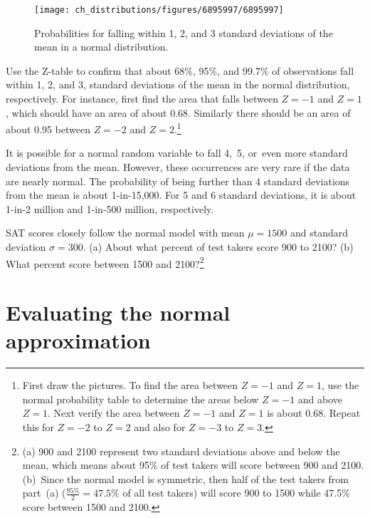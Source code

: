 \begin{figure}[hht]
\centering
\texttt{[image: ch\_distributions/figures/6895997/6895997]}
\caption{Probabilities for falling within 1, 2, and 3 standard deviations of the mean in a normal distribution.}
\label{6895997}
\end{figure}

\begin{exercise}
Use the Z-table to confirm that about 68\%, 95\%, and 99.7\% of observations fall within 1, 2, and 3, standard deviations of the mean in the normal distribution, respectively. For instance, first find the area that falls between $Z=-1$ and $Z=1$, which should have an area of about 0.68. Similarly there should be an area of about 0.95 between $Z=-2$ and $Z=2$.\footnote{First draw the pictures. To find the area between $Z=-1$ and $Z=1$, use the normal probability table to determine the areas below $Z=-1$ and above $Z=1$. Next verify the area between $Z=-1$ and $Z=1$ is about 0.68. Repeat this for $Z=-2$ to $Z=2$ and also for $Z=-3$ to $Z=3$.}
\end{exercise}

It is possible for a normal random variable to fall 4,~5, or~even more standard deviations from the mean. However, these occurrences are very rare if the data are nearly normal. The probability of being further than 4 standard deviations from the mean is about 1-in-15,000. For 5 and 6 standard deviations, it is about 1-in-2 million and 1-in-500 million, respectively.

\begin{exercise}
SAT scores closely follow the normal model with mean $\mu = 1500$ and standard deviation $\sigma = 300$. (a) About what percent of test takers score 900 to 2100? (b) What percent score between 1500 and 2100?\footnote{(a) 900 and 2100 represent two standard deviations above and below the mean, which means about 95\% of test takers will score between 900 and 2100. (b)~Since the normal model is symmetric, then half of the test takers from part~(a) ($\frac{95\%}{2} = 47.5\%$ of all test takers) will score 900 to 1500 while 47.5\% score between 1500 and 2100.}
\end{exercise}

\section[Evaluating the normal approximation]{Evaluating the normal approximation ~}
\label{assessingNormal}

